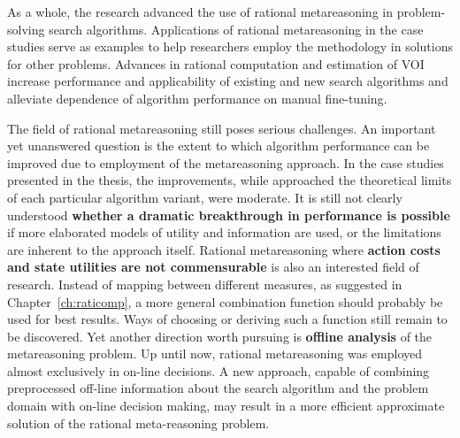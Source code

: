 As a whole, the research advanced the use of rational
metareasoning in problem-solving search algorithms. Applications of
rational metareasoning in the case studies serve as examples
to help researchers employ the methodology in solutions for other
problems. Advances in rational computation and estimation of VOI increase
performance and applicability of existing and new search algorithms
and alleviate dependence of algorithm performance on manual
fine-tuning.

The field of rational metareasoning still poses serious
challenges. An important yet unanswered question is the extent
to which algorithm performance can be improved due to employment of
the metareasoning approach. In the case studies presented in the thesis,
the improvements, while approached the theoretical limits of each
particular algorithm variant, were moderate. It is still not clearly
understood \textbf{whether a dramatic breakthrough in performance is possible}
if more elaborated models of utility and information are used, or the 
limitations are inherent to the approach itself. Rational
metareasoning where \textbf{action costs and state utilities are not
  commensurable} is also an interested field of research. Instead of
mapping between different measures, as suggested in
Chapter~\ref{ch:raticomp}, a more general combination function should
probably be used for best results. Ways of choosing or deriving such a
function still remain to be discovered. Yet another direction worth
pursuing is \textbf{offline analysis} of the metareasoning
problem. Up until now, rational metareasoning was employed almost
exclusively in on-line decisions. A new approach, capable of combining
preprocessed off-line information about the search algorithm and the
problem domain with on-line decision making, may result in a more
efficient approximate solution of the rational meta-reasoning problem.
